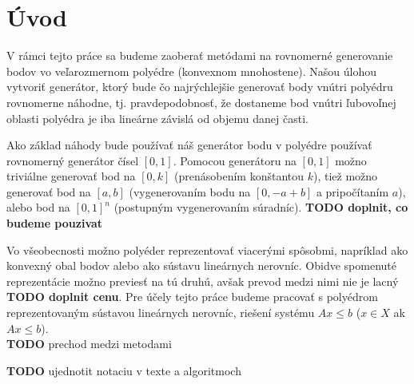 \chapter*{Úvod} %

V rámci tejto práce sa budeme zaoberať metódami na rovnomerné generovanie bodov vo veľarozmernom polyédre (konvexnom mnohostene). Našou úlohou vytvoriť generátor, ktorý bude čo najrýchlejšie generovať body vnútri polyédru rovnomerne náhodne, tj. pravdepodobnosť, že dostaneme bod vnútri ľubovoľnej oblasti polyédra je iba lineárne závislá od objemu danej časti.

Ako základ náhody bude používať náš generátor bodu v polyédre používať rovnomerný generátor čísel $[0,1]$. Pomocou generátoru na $[0,1]$ možno triviálne generovať bod na $[0,k]$ (prenásobením konštantou $k$), tiež možno generovať bod na $[a,b]$ (vygenerovaním bodu na $[0, -a+b]$ a pripočítaním $a$), alebo bod na $[0,1]^n$ (postupným vygenerovaním súradníc). \textbf{TODO doplnit, co budeme pouzivat}

Vo všeobecnosti možno polyéder reprezentovať viacerými spôsobmi, napríklad ako konvexný obal bodov alebo ako sústavu lineárnych nerovníc. Obidve spomenuté reprezentácie možno previesť na tú druhú, avšak prevod medzi nimi nie je lacný \textbf{TODO doplnit cenu}. Pre účely tejto práce budeme pracovať s polyédrom reprezentovaným sústavou lineárnych nerovníc, riešení systému $Ax \leq b$ ($x \in X$ ak $Ax \leq b$).\\

\textbf{TODO} prechod medzi metodami

\textbf{TODO} ujednotit notaciu v texte a algoritmoch